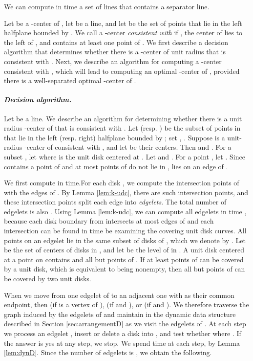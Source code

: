\documentclass[11pt]{myclass}
\begin{document}
\begin{lemma}
We can compute in  time a set  of  lines that contains a separator line.
\label{lem:separator-k2}
\end{lemma}

Let  be a -center of , let  be a line, and let  be the set of points that lie in the left halfplane bounded by .  We call  a -center \emph{consistent with } if , the center of  lies to the left of , and  contains at least one point of .  
We first describe a decision algorithm that determines whether there is a -center of unit radius that is consistent with .  Next, we describe an algorithm for computing a -center consistent with , which will lead to computing an optimal -center of , provided there is a well-separated optimal -center of .  

\paragraph{\textbf{\emph{Decision algorithm.}}}
Let  be a line.  We describe an algorithm for determining whether there is a unit radius -center of  that is consistent with .  Let  (resp. ) be the subset of points in  that lie in the left (resp. right) halfplane bounded by ; set , .  Suppose  is a unit-radius -center of  consistent with , and let  be their centers.  Then  and .
For a subset , let  where  is the unit disk centered at .  Let  and .  For a point , let .  Since  contains a point of  and at most  points of  do not lie in ,  lies on an edge of .  

We first compute  in  time.For each disk , we compute the intersection points of  with the edges of .  By Lemma \ref{lem:k-udc}, there are  such intersection points, and these intersection points split each edge into \emph{edgelets}.  The total number of edgelets is also .  
Using Lemma \ref{lem:k-udc}, we can compute all edgelets in time , because each disk boundary from  intersects at most  edges of  and each intersection can be found in  time be examining the covering unit disk curves.
All points on an edgelet  lie in the same subset of disks of , which we denote by .  Let  be the set of centers of disks in , and let  be the level of  in .  A unit disk centered at a point on  contains  and all but  points of .  If at least  points of  can be covered by a unit disk, which is equivalent to  being nonempty, then all but  points of  can be covered by two unit disks.  

When we move from one edgelet  of  to an adjacent one  with  as their common endpoint, then  (if  is a vertex of ),  (if  and ), or  (if  and ).  
We therefore traverse the graph induced by the edgelets of  and maintain  in the dynamic  data structure described  in Section \ref{sec:arrangementD} as we visit the edgelets  of .  At each step we process an edgelet , insert or delete a disk into , and test whether  where .  If the answer is yes at any step, we stop.  We spend  time at each step, by Lemma \ref{lem:dynD}.  Since the number of edgelets is , we obtain the following.
\end{document}
